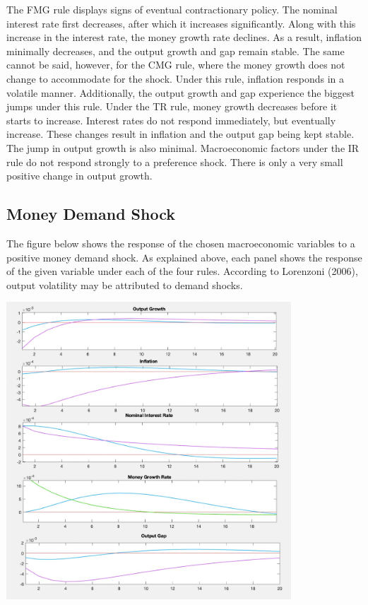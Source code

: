 \documentclass[11pt,preprint, authoryear]{elsarticle}
\let\origfigure\figure
\let\endorigfigure\endfigure
\renewenvironment{figure}[1][2] {
    \expandafter\origfigure\expandafter[H]
} {
    \endorigfigure
}
\numberwithin{equation}{section}
\numberwithin{figure}{section}
\numberwithin{table}{section}
\begin{document}
The FMG rule displays signs of eventual contractionary policy. The
nominal interest rate first decreases, after which it increases
significantly. Along with this increase in the interest rate, the money
growth rate declines. As a result, inflation minimally decreases, and
the output growth and gap remain stable. The same cannot be said,
however, for the CMG rule, where the money growth does not change to
accommodate for the shock. Under this rule, inflation responds in a
volatile manner. Additionally, the output growth and gap experience the
biggest jumps under this rule. Under the TR rule, money growth decreases
before it starts to increase. Interest rates do not respond immediately,
but eventually increase. These changes result in inflation and the
output gap being kept stable. The jump in output growth is also minimal.
Macroeconomic factors under the IR rule do not respond strongly to a
preference shock. There is only a very small positive change in output
growth.

\hypertarget{money-demand-shock}{%
\subsection{Money Demand Shock}\label{money-demand-shock}}

The figure below shows the response of the chosen macroeconomic
variables to a positive money demand shock. As explained above, each
panel shows the response of the given variable under each of the four
rules. According to Lorenzoni (2006), output volatility may be
attributed to demand shocks.

\begin{figure}
\centering
\includegraphics[width=0.8\textwidth,height=0.6\textheight]{./figures/money-demand-shock.jpeg}
\caption{Plots of Impulse Response Functions for a Money Demand Shock}
\end{figure}
\end{document}
